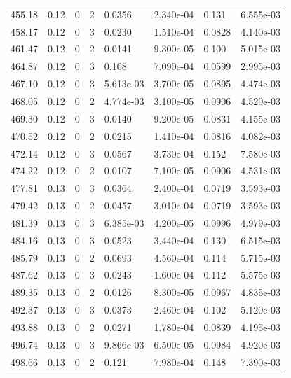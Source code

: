 \documentclass[preview]{standalone}
\begin{document}
{{{{{{{{\begin{tabular}{L{1.2cm}C{1.2cm} C{0.3cm}C{0.5cm} C{1.4cm}C{1.4cm} C{1.4cm}C{1.4cm}}
  455.18  &  0.12  & 0     &  2 &  0.0356  & 2.340e-04  & 0.131 &  6.555e-03   \\ 
  458.17  &  0.12  & 0     &  3 &  0.0230  & 1.510e-04  & 0.0828 &  4.140e-03   \\ 
  461.47  &  0.12  & 0     &  2 &  0.0141  & 9.300e-05  & 0.100 &  5.015e-03   \\ 
  464.87  &  0.12  & 0     &  3 &  0.108  & 7.090e-04  & 0.0599 &  2.995e-03   \\ 
  467.10  &  0.12  & 0     &  3 &  5.613e-03  & 3.700e-05  & 0.0895 &  4.474e-03   \\ 
  468.05  &  0.12  & 0     &  2 &  4.774e-03  & 3.100e-05  & 0.0906 &  4.529e-03   \\ 
  469.30  &  0.12  & 0     &  3 &  0.0140  & 9.200e-05  & 0.0831 &  4.155e-03   \\ 
  470.52  &  0.12  & 0     &  2 &  0.0215  & 1.410e-04  & 0.0816 &  4.082e-03   \\ 
  472.14  &  0.12  & 0     &  3 &  0.0567  & 3.730e-04  & 0.152 &  7.580e-03   \\ 
  474.22  &  0.12  & 0     &  2 &  0.0107  & 7.100e-05  & 0.0906 &  4.531e-03   \\ 
  477.81  &  0.13  & 0     &  3 &  0.0364  & 2.400e-04  & 0.0719 &  3.593e-03   \\ 
  479.42  &  0.13  & 0     &  2 &  0.0457  & 3.010e-04  & 0.0719 &  3.593e-03   \\ 
  481.39  &  0.13  & 0     &  3 &  6.385e-03  & 4.200e-05  & 0.0996 &  4.979e-03   \\ 
  484.16  &  0.13  & 0     &  3 &  0.0523  & 3.440e-04  & 0.130 &  6.515e-03   \\ 
  485.79  &  0.13  & 0     &  2 &  0.0693  & 4.560e-04  & 0.114 &  5.715e-03   \\ 
  487.62  &  0.13  & 0     &  3 &  0.0243  & 1.600e-04  & 0.112 &  5.575e-03   \\ 
  489.35  &  0.13  & 0     &  2 &  0.0126  & 8.300e-05  & 0.0967 &  4.835e-03   \\ 
  492.37  &  0.13  & 0     &  3 &  0.0373  & 2.460e-04  & 0.102 &  5.120e-03   \\ 
  493.88  &  0.13  & 0     &  2 &  0.0271  & 1.780e-04  & 0.0839 &  4.195e-03   \\ 
  496.74  &  0.13  & 0     &  3 &  9.866e-03  & 6.500e-05  & 0.0984 &  4.920e-03   \\ 
  498.66  &  0.13  & 0     &  2 &  0.121  & 7.980e-04  & 0.148 &  7.390e-03   \\ 

\end{tabular}}}}}}}}}
\end{document}
